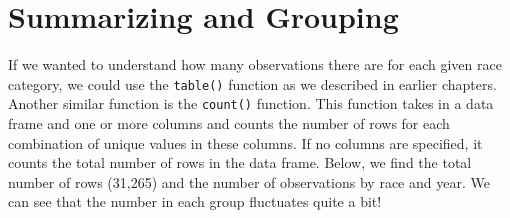 \documentclass[
  letterpaper,
]{krantz}
\begin{document}
\section{Summarizing and Grouping}\label{summarizing-and-grouping}

If we wanted to understand how many observations there are for each
given race category, we could use the \texttt{table()} function as we
described in earlier chapters. Another similar function is the
\texttt{count()} function. This function takes in a data frame and one
or more columns and counts the number of rows for each combination of
unique values in these columns. If no columns are specified, it counts
the total number of rows in the data frame. Below, we find the total
number of rows (31,265) and the number of observations by race and year.
We can see that the number in each group fluctuates quite a bit!
\end{document}
